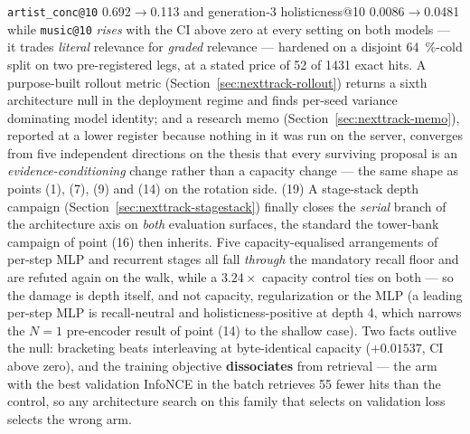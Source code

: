 \documentclass[11pt]{article}
\begin{document}
\texttt{artist\_conc@10} \num{0.692}$\to$\num{0.113} and generation-3
holisticness@10 \num{0.0086}$\to$\num{0.0481} while \texttt{music@10} \emph{rises}
with the CI above zero at every setting on both models --- it trades \emph{literal}
relevance for \emph{graded} relevance --- hardened on a disjoint
\SI{64}{\percent}-cold split on two pre-registered legs, at a stated price of
\num{52} of \num{1431} exact hits. A purpose-built rollout metric
(Section~\ref{sec:nexttrack-rollout}) returns a sixth architecture null in the
deployment regime and finds per-seed variance dominating model identity; and a
research memo (Section~\ref{sec:nexttrack-memo}), reported at a lower register
because nothing in it was run on the server, converges from five independent
directions on the thesis that every surviving proposal is an
\emph{evidence-conditioning} change rather than a capacity change --- the same shape
as points (1), (7), (9) and (14) on the rotation side.
(19) A stage-stack depth campaign (Section~\ref{sec:nexttrack-stagestack}) finally
closes the \emph{serial} branch of the architecture axis on \emph{both} evaluation
surfaces, the standard the tower-bank campaign of point (16) then inherits. Five
capacity-equalised arrangements of per-step MLP and recurrent stages all fall
\emph{through} the mandatory recall floor and are refuted again on the walk, while a
$\num{3.24}\times$ capacity control ties on both --- so the damage is depth itself,
and not capacity, regularization or the MLP (a leading per-step MLP is
recall-neutral and holisticness-positive at depth 4, which narrows the $N=1$
pre-encoder result of point (14) to the shallow case). Two facts outlive the null:
bracketing beats interleaving at byte-identical capacity ($+\num{0.01537}$, CI
above zero), and the training objective \textbf{dissociates} from retrieval --- the
arm with the best validation InfoNCE in the batch retrieves \num{55} fewer hits
than the control, so any architecture search on this family that selects on
validation loss selects the wrong arm.
\end{document}
